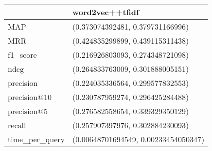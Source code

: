\begin{tabular}{ll}
\toprule
{} &                       word2vec++tfidf \\
\midrule
MAP            &      (0.373074392481, 0.379731166996) \\
MRR            &      (0.424835299899, 0.439115311438) \\
f1\_score       &      (0.216926803093, 0.274348721098) \\
ndcg           &      (0.264833763009, 0.301888005151) \\
precision      &      (0.224035336564, 0.299577832553) \\
precision@10   &      (0.230787959274, 0.296425284488) \\
precision@5    &      (0.276582558654, 0.339329350129) \\
recall         &      (0.257907397976, 0.302884230093) \\
time\_per\_query &  (0.00648701694549, 0.00233454050347) \\
\bottomrule
\end{tabular}
